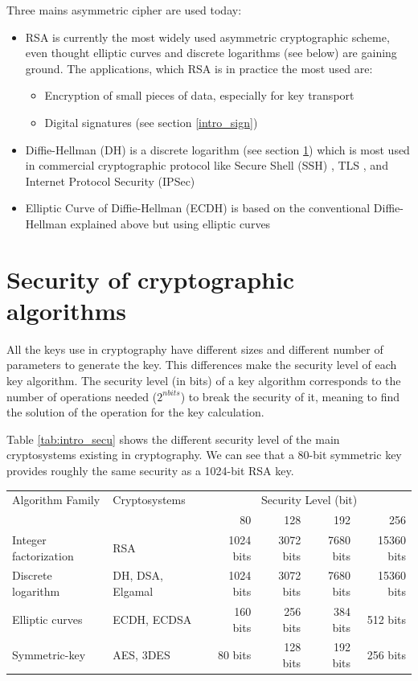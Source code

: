 Three mains asymmetric cipher are used today:
\begin{itemize}
  \item RSA \cite{RFC3447} is currently the most widely used asymmetric
  cryptographic scheme, even thought elliptic curves and discrete logarithms (see below) are gaining
  ground. The applications, which RSA is in practice the most used are:
  \begin{itemize}[noitemsep]
    \item Encryption of small pieces of data, especially for key transport
    \item Digital signatures (see section \ref{intro_sign})
  \end{itemize}
  
  \item Diffie-Hellman (DH) is a discrete logarithm (see section
  \ref{intro_secu}) which is most used in commercial cryptographic protocol like
  Secure Shell (SSH) \cite{RFC5647}, TLS \cite{RFC5246}, and Internet Protocol Security
  (IPSec) \cite{RFC3602}
  \item Elliptic Curve of Diffie-Hellman (ECDH) is based on the conventional
  Diffie-Hellman explained above but using elliptic curves \cite{RFC4492}
\end{itemize}

\section{Security of cryptographic algorithms}
\label{intro_secu}

All the keys use in cryptography have different sizes and different number of
parameters to generate the key.
This differences make the security level of each key algorithm.
The security level (in bits) of a key algorithm corresponds to the number of
operations needed ($2^{nbits}$) to break the security of it, meaning to find the
solution of the operation for the key calculation.

Table \ref{tab:intro_secu} shows the different security level of the main
cryptosystems existing in cryptography. We can see that a 80-bit symmetric key
provides roughly the same security as a 1024-bit RSA key.\newline

\begin{tabular}{|l|l|*{4}{r|}}
 \hline
 Algorithm Family	& Cryptosystems & \multicolumn{4}{|c|}{Security Level (bit)}\\
 					&				& 80 & 128 & 192 & 256 \\
 \hline
 Integer factorization & RSA & 1024	bits & 3072 bits & 7680 bits & 15360 bits \\
 Discrete logarithm & DH, DSA, Elgamal & 1024 bits & 3072 bits & 7680 bits &
 15360 bits \\
 Elliptic curves & ECDH, ECDSA & 160 bits & 256 bits & 384 bits & 512 bits \\
 \hline
 Symmetric-key & AES, 3DES & 80 bits & 128 bits & 192 bits & 256 bits \\
 \hline

\end{tabular}
\label{tab:intro_secu}


